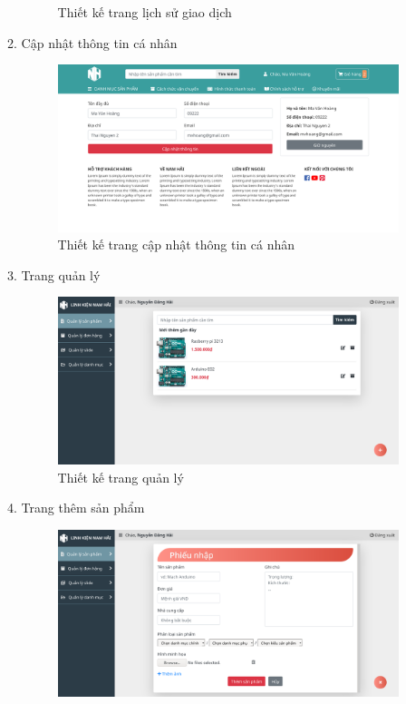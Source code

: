 \begin{enumerate}[label=\textbf{\alph*)}]
\begin{enumerate}[label=\textbf{\alph*)}]
\begin{figure}[h!]
		      \caption{Thiết kế trang lịch sử giao dịch}
	      \end{figure}
	\item Cập nhật thông tin cá nhân
	      \begin{figure}[h!]
		      \centering
		      \includegraphics[width=\linewidth]{fig/r_user2.png}
		      \caption{Thiết kế trang cập nhật thông tin cá nhân}
	      \end{figure}
	      \newpage
	\item Trang quản lý
	      \begin{figure}[h!]
		      \centering
		      \includegraphics[width=\linewidth]{fig/r_manage_product.png}
		      \caption{Thiết kế trang quản lý}
	      \end{figure}
	\item Trang thêm sản phẩm
	      \begin{figure}[h!]
		      \centering
		      \includegraphics[width=\linewidth]{fig/r_manage_product_add_product.png}

\end{figure}
\end{enumerate}
\end{enumerate}
